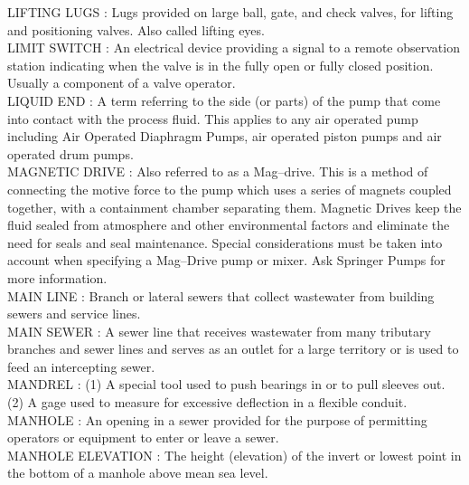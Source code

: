 \vspace{0.15cm}
LIFTING LUGS :   Lugs provided on large ball, gate, and check valves, for lifting and positioning valves. Also called lifting eyes.\\
\vspace{0.15cm}
LIMIT SWITCH :   An electrical device providing a signal to a remote observation station indicating when the valve is in the fully open or fully closed position. Usually a component of a valve operator.\\
\vspace{0.15cm}
LIQUID END :   A term referring to the side (or parts) of the pump that come into contact with the process fluid. This applies to any air operated pump including Air Operated Diaphragm Pumps, air operated piston pumps and air operated drum pumps.\\
\vspace{0.15cm}
MAGNETIC DRIVE :   Also referred to as a Mag–drive. This is a method of connecting the motive force to the pump which uses a series of magnets coupled together, with a containment chamber separating them. Magnetic Drives keep the fluid sealed from atmosphere and other environmental factors and eliminate the need for seals and seal maintenance. Special considerations must be taken into account when specifying a Mag–Drive pump or mixer. Ask Springer Pumps for more information.\\
\vspace{0.15cm}
MAIN LINE :  Branch or lateral sewers that collect wastewater from building sewers and service lines. \\
\vspace{0.15cm}
MAIN SEWER :  A sewer line that receives wastewater from many tributary branches and sewer lines and serves as an outlet for a large territory or is used to feed an intercepting sewer. \\
\vspace{0.15cm}
MANDREL :  (1) A special tool used to push bearings in or to pull sleeves out. (2) A gage used to measure for excessive deflection in a flexible conduit. \\
\vspace{0.15cm}
MANHOLE :  An opening in a sewer provided for the purpose of permitting operators or equipment to enter or leave a sewer. \\
\vspace{0.15cm}
MANHOLE ELEVATION :  The height (elevation) of the invert or lowest point in the bottom of a manhole above mean sea level. \\
